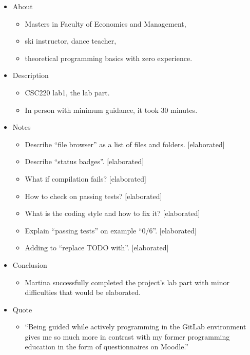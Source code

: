 \begin{itemize}
\item
  {About}
  \begin{itemize}
  \item
    {Masters in Faculty of Economics and Management,}
  \item
    {ski instructor, dance teacher,}
  \item
    {theoretical programming basics with zero experience.}
  \end{itemize}

\item
  {Description}
  \begin{itemize}
  \item
    {CSC220 lab1, the lab part.}
  \item
    {In person with minimum guidance, it took 30 minutes.}
  \end{itemize}

\item
  {Notes}
  \begin{itemize}
  \item
    {Describe ``file browser'' as a list of files and folders. {[}elaborated{]}}
  \item
    {Describe ``status badges''. {[}elaborated{]}}
  \item
    {What if compilation fails? {[}elaborated{]}}
  \item
    {How to check on passing tests? {[}elaborated{]}}
  \item
    {What is the coding style and how to fix it? {[}elaborated{]}}
  \item
    {Explain ``passing tests'' on example ``0/6''. {[}elaborated{]}}
  \item
    {Adding to ``replace TODO with''. {[}elaborated{]}}
  \end{itemize}

\item
  {Conclusion}
  \begin{itemize}
  \item
    {Martina successfully completed the project's lab part with minor difficulties that would be elaborated.}
  \end{itemize}

\item
  {Quote}
  \begin{itemize}
  \item
    {``Being guided while actively programming in the GitLab environment gives me so much more in contrast with my former programming education in the form of questionnaires on Moodle.''}
  \end{itemize}
\end{itemize}

